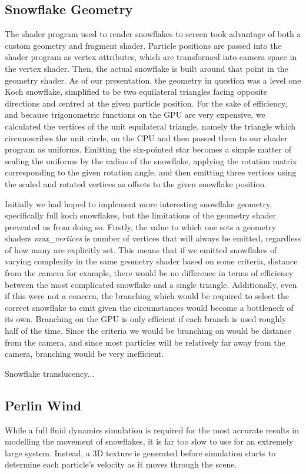 \documentclass[conference]{acmsiggraph}
\begin{document}
\subsection{Snowflake Geometry}
The shader program used to render snowflakes to screen took advantage of both a custom geometry and fragment shader. Particle positions are passed into the shader program as vertex attributes, which are transformed into camera space in the vertex shader. Then, the actual snowflake is built around that point in the geometry shader. As of our presentation, the geometry in question was a level one Koch snowflake, simplified to be two equilateral triangles facing opposite directions and centred at the given particle position. For the sake of efficiency, and because trigonometric functions on the GPU are very expensive, we calculated the vertices of the unit equilateral triangle, namely the triangle which circumscribes the unit circle, on the CPU and then passed them to our shader program as uniforms. Emitting the six-pointed star becomes a simple matter of scaling the uniforms by the radius of the snowflake, applying the rotation matrix corresponding to the given rotation angle, and then emitting three vertices using the scaled and rotated vertices as offsets to the given snowflake position.

Initially we had hoped to implement more interesting snowflake geometry, specifically full koch snowflakes, but the limitations of the geometry shader prevented us from doing so. Firstly, the value to which one sets a geometry shaders \textit{max\_vertices} is number of vertices that will always be emitted, regardless of how many are explicitly set. This means that if we emitted snowflakes of varying complexity in the same geometry shader based on some criteria, distance from the camera for example, there would be no difference in terms of efficiency between the most complicated snowflake and a single triangle. Additionally, even if this were not a concern, the branching which would be required to select the correct snowflake to emit given the circumstances would become a bottleneck of its own. Branching on the GPU is only efficient if each branch is used roughly half of the time. Since the criteria we would be branching on would be distance from the camera, and since most particles will be relatively far away from the camera, branching would be very inefficient.

Snowflake translucency...

\subsection{Perlin Wind}
While a full fluid dynamics simulation is required for the most accurate results in modelling the movement of snowflakes, it is far too slow to use for an extremely large system. Instead, a 3D texture is generated before simulation starts to determine each particle's velocity as it moves through the scene.
\end{document}
